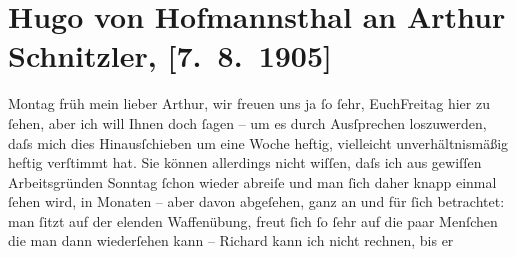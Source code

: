 

         
         \renewcommand{\erwaehntePersonen}{Personen: Hermann Bahr, Anna Bahr-Mildenburg, Richard Beer-Hofmann, Olga Schnitzler}
         \renewcommand{\erwaehnteOrte}{Orte: Bayern, Wien}
         \renewcommand{\erwaehnteWerke}{}
               \section[Hugo von Hofmannsthal an Arthur Schnitzler, {[}7. 8. 1905{]}]{ Hugo von Hofmannsthal an Arthur Schnitzler, {[}7. 8. 1905{]}}\nopagebreak{}\rehead{ }\begin{ledgroupsized}[t]{13cm}\normalsize\beginnumbering \toendnotes[C]{\smallbreak\pagebreak[2]} 
\toendnotes[C]{\smallbreak}\pstart
           \raggedleft{}{\pb}Montag früh\pend
           \pstart{}mein lieber Arthur,\pend\pstart
           wir freuen uns ja ſo ſehr, EuchFreitag hier zu ſehen, aber ich will Ihnen doch ſagen – um es durch
               Ausſprechen loszuwerden, daſs mich dies Hinausſchieben um eine Woche heftig,
               vielleicht unverhältnismäßig heftig verſtimmt hat. \label{OL450-1v}\label{OL450-1h}Sie können allerdings nicht wiſſen, {\pb}daſs ich aus gewiſſen
               Arbeitsgründen Sonntag{ }ſchon wieder abreiſe und man ſich daher knapp
               einmal ſehen wird, in Monaten – aber davon abgeſehen, ganz an und für ſich
               betrachtet: man ſitzt auf der elenden Waffenübung, freut ſich ſo ſehr auf die paar
               Menſchen {\pb}die man dann wiederſehen
               kann – Richard kann ich nicht rechnen, bis er

\end{ledgroupsized}
